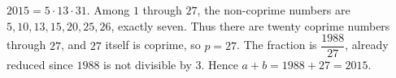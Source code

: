 $2015=5\cdot13\cdot31$. Among $1$ through $27$, the non-coprime numbers are $5,10,13,15,20,25,26$, exactly seven. Thus there are twenty coprime numbers through $27$, and $27$ itself is coprime, so $p=27$. The fraction is $\dfrac{1988}{27}$, already reduced since $1988$ is not divisible by $3$. Hence $a+b=1988+27=\boxed{2015}$.
